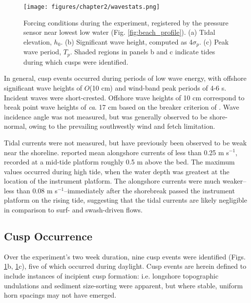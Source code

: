 \begin{figure}[tbp]
 	\texttt{[image: figures/chapter2/wavestats.png]}
	\caption[Wave, tide, and cusp occurrence data from Advocate 2015 experiment]{Forcing conditions during the experiment, registered by the pressure sensor near lowest low water (Fig. \ref{fig:beach_profile}). (a) Tidal elevation, $h_{0}$. (b) Significant wave height, computed as 4$\sigma_p$. (c) Peak wave period, $T_{p}$. Shaded regions in panels b and c indicate tides during which cusps were identified.}
	\label{fig:wavestats_slope}
\end{figure}

In general, cusp events occurred during periods of low wave energy, with offshore significant wave heights of $O$(10 cm) and wind-band peak periods of 4-6 s. Incident waves were short-crested. Offshore wave heights of 10 cm correspond to break point wave heights of \textit{ca}. 17 cm based on the breaker criterion of \citet[][p. 115]{Dean_Dalrymple1984}. Wave incidence angle was not measured, but was generally observed to be shore-normal, owing to the prevailing southwestly wind and fetch limitation.

Tidal currents were not measured, but have previously been observed to be weak near the shoreline. \citet{Hay_etal2014} reported mean alongshore currents of less than 0.25 m s$^{-1}$, recorded at a mid-tide platform roughly 0.5 m above the bed. The maximum values occurred during high tide, when the water depth was greatest at the location of the instrument platform. The alongshore currents were much weaker--less than 0.08 m s$^{-1}$--immediately after the shorebreak passed the instrument platform on the rising tide, suggesting that the tidal currents are likely negligible in comparison to surf- and swash-driven flows. 


\subsection{Cusp Occurrence}

Over the experiment's two week duration, nine cusp events were identified (Figs. \ref{fig:wavestats_slope}b, \ref{fig:wavestats_slope}c), five of which occurred during daylight. Cusp events are herein defined to include instances of incipient cusp formation: i.e. longshore topographic undulations and sediment size-sorting were apparent, but where stable, uniform horn spacings may not have emerged. 

